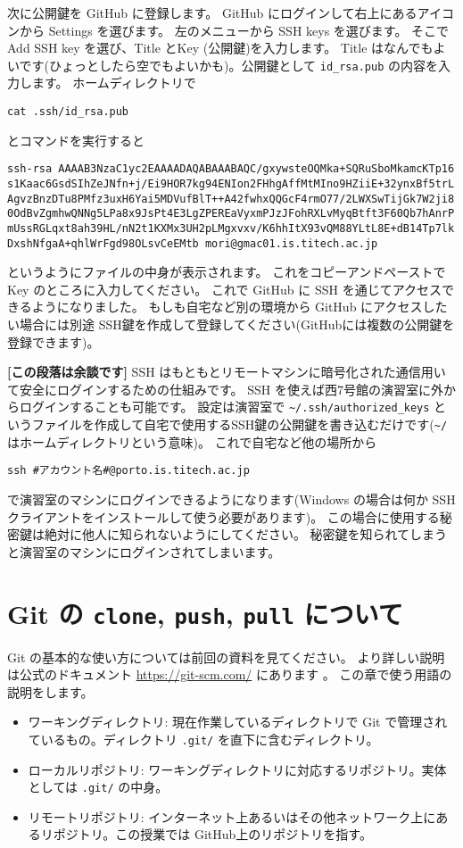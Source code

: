 \documentclass[a4paper]{article}
\begin{document}
次に公開鍵を GitHub に登録します。
GitHub にログインして右上にあるアイコンから Settings を選びます。
左のメニューから SSH keys を選びます。
そこで Add SSH key を選び、Title  とKey (公開鍵)を入力します。
Title はなんでもよいです(ひょっとしたら空でもよいかも)。公開鍵として \texttt{id\_rsa.pub} の内容を入力します。
ホームディレクトリで
\begin{verbatim}
cat .ssh/id_rsa.pub
\end{verbatim}
とコマンドを実行すると
\begin{verbatim}
ssh-rsa AAAAB3NzaC1yc2EAAAADAQABAAABAQC/gxywsteOQMka+SQRuSboMkamcKTp16
s1Kaac6GsdSIhZeJNfn+j/Ei9HOR7kg94ENIon2FHhgAffMtMIno9HZiiE+32ynxBf5trL
AgvzBnzDTu8PMfz3uxH6Yai5MDVufBlT++A42fwhxQQGcF4rmO77/2LWXSwTijGk7W2ji8
0OdBvZgmhwQNNg5LPa8x9JsPt4E3LgZPEREaVyxmPJzJFohRXLvMyqBtft3F60Qb7hAnrP
mUssRGLqxt8ah39HL/nN2t1KXMx3UH2pLMgxvxv/K6hhItX93vQM88YLtL8E+dB14Tp7lk
DxshNfgaA+qhlWrFgd98OLsvCeEMtb mori@gmac01.is.titech.ac.jp
\end{verbatim}
というようにファイルの中身が表示されます。
これをコピーアンドペーストで Key のところに入力してください。
%
これで GitHub に SSH を通じてアクセスできるようになりました。
もしも自宅など別の環境から GitHub にアクセスしたい場合には別途 SSH鍵を作成して登録してください(GitHubには複数の公開鍵を登録できます)。

\textbf{[この段落は余談です]} SSH はもともとリモートマシンに暗号化された通信用いて安全にログインするための仕組みです。
SSH を使えば西7号館の演習室に外からログインすることも可能です。
設定は演習室で \texttt{\~{}/.ssh/authorized\_keys} というファイルを作成して自宅で使用するSSH鍵の公開鍵を書き込むだけです(\texttt{\~{}/}はホームディレクトリという意味)。
これで自宅など他の場所から
\begin{verbatim}
ssh #アカウント名#@porto.is.titech.ac.jp
\end{verbatim}
で演習室のマシンにログインできるようになります(Windows の場合は何か SSH クライアントをインストールして使う必要があります)。
この場合に使用する秘密鍵は絶対に他人に知られないようにしてください。
秘密鍵を知られてしまうと演習室のマシンにログインされてしまいます。


\section{Git の \texttt{clone}, \texttt{push}, \texttt{pull} について}
Git の基本的な使い方については前回の資料を見てください。
より詳しい説明は公式のドキュメント \url{https://git-scm.com/} にあります 。
この章で使う用語の説明をします。
\begin{itemize}
\item ワーキングディレクトリ: 現在作業しているディレクトリで Git で管理されているもの。ディレクトリ \texttt{.git/} を直下に含むディレクトリ。
\item ローカルリポジトリ: ワーキングディレクトリに対応するリポジトリ。実体としては \texttt{.git/} の中身。
\item リモートリポジトリ: インターネット上あるいはその他ネットワーク上にあるリポジトリ。この授業では GitHub上のリポジトリを指す。
\end{itemize}
\end{document}
